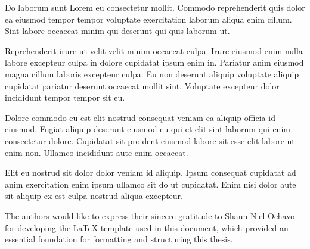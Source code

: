 \begin{acknowledgment}

  Do laborum sunt Lorem eu consectetur mollit. Commodo reprehenderit quis dolor ea eiusmod tempor tempor voluptate exercitation laborum aliqua enim cillum. Sint labore occaecat minim qui deserunt qui quis laborum ut.

  Reprehenderit irure ut velit velit minim occaecat culpa. Irure eiusmod enim nulla labore excepteur culpa in dolore cupidatat ipsum enim in. Pariatur anim eiusmod magna cillum laboris excepteur culpa. Eu non deserunt aliquip voluptate aliquip cupidatat pariatur deserunt occaecat mollit sint. Voluptate excepteur dolor incididunt tempor tempor sit eu.

  Dolore commodo eu est elit nostrud consequat veniam ea aliquip officia id eiusmod. Fugiat aliquip deserunt eiusmod eu qui et elit sint laborum qui enim consectetur dolore. Cupidatat sit proident eiusmod labore sit esse elit labore ut enim non. Ullamco incididunt aute enim occaecat.

  Elit eu nostrud sit dolor dolor veniam id aliquip. Ipsum consequat cupidatat ad anim exercitation enim ipsum ullamco sit do ut cupidatat. Enim nisi dolor aute sit aliquip ex est culpa nostrud aliqua excepteur.

  The authors would like to express their sincere gratitude to Shaun Niel Ochavo for developing the LaTeX template used in this document, which provided an essential foundation for formatting and structuring this thesis.

\end{acknowledgment}
